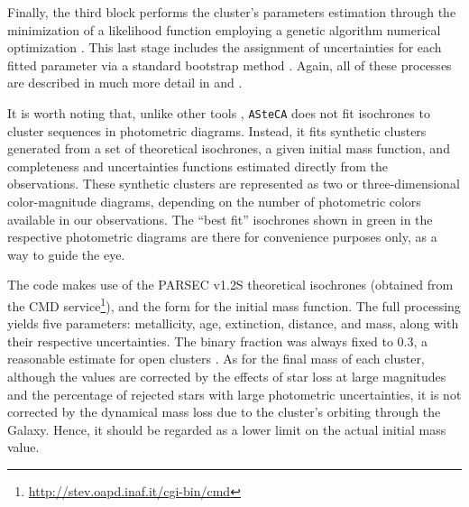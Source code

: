\documentclass[draft]{aa}
\begin{document}
Finally, the third block performs the cluster's parameters estimation through
the minimization of a likelihood function \citep{Dolphin_2002} employing a
genetic algorithm numerical optimization \citep{Charbonneau_1995}. This last
stage includes the assignment of uncertainties for each fitted parameter via a
standard bootstrap method \citep{efron1986}. Again, all of these processes are
described in much more detail in \cite{Perren_2015} and \cite{Perren_2017}.

It is worth noting that, unlike other tools \citep[e.g.:][]{Yen_2018},
\texttt{ASteCA} does not fit isochrones to cluster sequences in photometric
diagrams. Instead, it fits synthetic clusters generated from a set of
theoretical isochrones, a given initial mass function, and completeness and
uncertainties functions estimated directly from the observations.
These synthetic clusters are represented as two or three-dimensional
color-magnitude diagrams, depending on the number of photometric colors
available in our observations. The ``best fit'' isochrones shown in green in
the respective photometric diagrams are there for convenience purposes only, as
a way to guide the eye.

The code makes use of the PARSEC v1.2S \citep{Bressan_2012} theoretical
isochrones (obtained from the CMD
service\footnote{\url{http://stev.oapd.inaf.it/cgi-bin/cmd}}), and the
\cite{Kroupa_2002} form for the initial mass function. The full processing
yields five parameters: metallicity, age, extinction,
distance, and mass, along with their respective uncertainties. The binary
fraction was always fixed to 0.3, a reasonable
estimate for open clusters \citep{Sollima_2010}. As for the final mass of each
cluster, although the values are corrected by the effects of star loss at large
magnitudes and the percentage of rejected stars with large photometric
uncertainties, it is not corrected by the dynamical mass loss due to the
cluster's orbiting through the Galaxy. Hence, it should be regarded as a lower
limit on the actual initial mass value.
\end{document}
